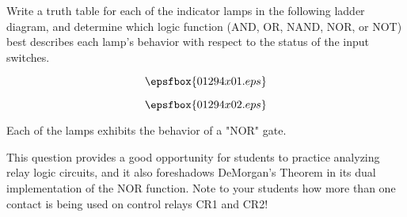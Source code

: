 

Write a truth table for each of the indicator lamps in the following ladder diagram, and determine which logic function (AND, OR, NAND, NOR, or NOT) best describes each lamp's behavior with respect to the status of the input switches.

$$\epsfbox{01294x01.eps}$$







$$\epsfbox{01294x02.eps}$$

Each of the lamps exhibits the behavior of a "NOR" gate.







This question provides a good opportunity for students to practice analyzing relay logic circuits, and it also foreshadows DeMorgan's Theorem in its dual implementation of the NOR function.  Note to your students how more than one contact is being used on control relays CR1 and CR2!




